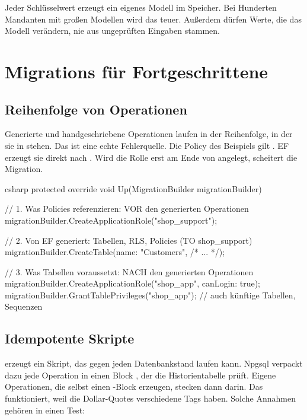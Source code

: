 \begin{important}
  Jeder Schlüsselwert erzeugt ein eigenes Modell im Speicher. Bei Hunderten Mandanten mit
  großen Modellen wird das teuer. Außerdem dürfen Werte, die das Modell verändern, nie aus
  ungeprüften Eingaben stammen.
\end{important}

\chapter{Migrations für Fortgeschrittene}\label{ch:advanced-migrations}

\section{Reihenfolge von Operationen}

Generierte und handgeschriebene Operationen laufen in der Reihenfolge, in der sie in
 stehen. Das ist eine echte Fehlerquelle. Die Policy
 des Beispiels gilt .
EF erzeugt sie direkt nach . Wird die Rolle erst am Ende von
 angelegt, scheitert die Migration.

\begin{sourcecode}{csharp}
protected override void Up(MigrationBuilder migrationBuilder)
{
    // 1. Was Policies referenzieren: VOR den generierten Operationen
    migrationBuilder.CreateApplicationRole("shop_support");

    // 2. Von EF generiert: Tabellen, RLS, Policies (TO shop_support)
    migrationBuilder.CreateTable(name: "Customers", /* ... */);

    // 3. Was Tabellen voraussetzt: NACH den generierten Operationen
    migrationBuilder.CreateApplicationRole("shop_app", canLogin: true);
    migrationBuilder.GrantTablePrivileges("shop_app");   // auch künftige Tabellen, Sequenzen
}
\end{sourcecode}

\section{Idempotente Skripte}

 erzeugt ein Skript, das gegen jeden
Datenbankstand laufen kann. Npgsql verpackt dazu jede Operation in einen Block , der die Historientabelle prüft.
Eigene Operationen, die selbst einen -Block erzeugen, stecken dann darin. Das
funktioniert, weil die Dollar-Quotes verschiedene Tags haben. Solche Annahmen gehören in
einen Test:

